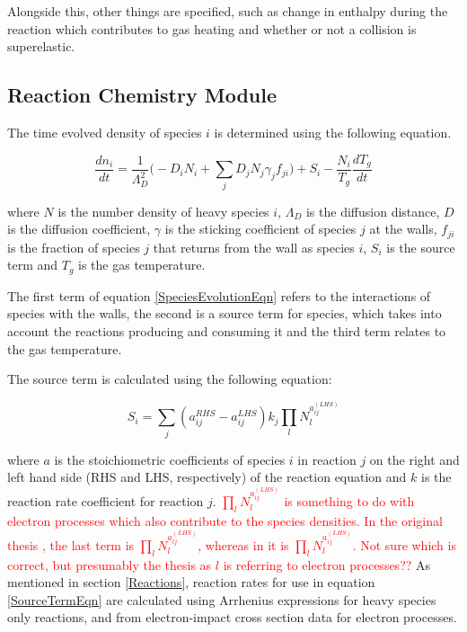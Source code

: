 \documentclass[11pt, oneside]{article}   	%
\begin{document}
Alongside this, other things are specified, such as change in enthalpy during the reaction which contributes to gas heating and whether or not a collision is superelastic.

\subsection{Reaction Chemistry Module}

The time evolved density of species $i$ is determined using the following equation.

\begin{equation}
\frac{dn_i}{dt} = \frac{1}{\Lambda_D^2}\bigg(-D_iN_i + \sum_jD_jN_j\gamma_jf_{ji}\bigg) + S_i - \frac{N_i}{T_g}\frac{dT_g}{dt}
\label{SpeciesEvolutionEqn}
\end{equation}

where $N$ is the number density of heavy species $i$, $\Lambda_D$ is the diffusion distance, $D$ is the diffusion coefficient, $\gamma$ is the sticking coefficient of species $j$ at the walls, $f_{ji}$ is the fraction of species $j$ that returns from the wall as species $i$, $S_i$ is the source term and $T_g$ is the gas temperature.

The first term of equation \ref{SpeciesEvolutionEqn} refers to the interactions of species with the walls, the second is a source term for species, which takes into account the reactions producing and consuming it and the third term relates to the gas temperature.

The source term is calculated using the following equation:

\begin{equation}
S_i = \sum_j(a_{ij}^{RHS}-a_{ij}^{LHS})k_j\prod_lN_l^{a_{ij}^{(LHS)}}
\label{SourceTermEqn}
\end{equation}

where $a$ is the stoichiometric coefficients of species $i$ in reaction $j$ on the right and left hand side (RHS and LHS, respectively) of the reaction equation and $k$ is the reaction rate coefficient for reaction $j$.
\textcolor{red}{ $\prod_lN_l^{a_{ij}^{(LHS)}}$ is something to do with electron processes which also contribute to the species densities. 
In the original thesis \cite{Dorai2002modeling}, the last term is $\prod_lN_l^{a_{lj}^{(LHS)}}$, whereas in \cite{Stafford2004O2} it is $\prod_lN_l^{a_{ij}^{(LHS)}}$. 
Not sure which is correct, but presumably the thesis as $l$ is referring to electron processes??}
As mentioned in section \ref{Reactions}, reaction rates for use in equation \ref{SourceTermEqn} are calculated using Arrhenius expressions for heavy species only reactions, and from electron-impact cross section data for electron processes. 
\end{document}
